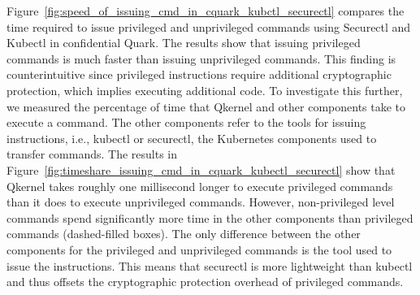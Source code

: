Figure~\ref{fig:speed_of_issuing_cmd_in_cquark_kubctl_securectl} compares the time required to issue privileged and unprivileged commands using Securectl and Kubectl in confidential Quark. The results show that issuing privileged commands is much faster than issuing unprivileged commands. 
This finding is counterintuitive since privileged instructions require additional cryptographic protection, which implies executing additional code. To investigate this further, we measured the percentage of time that Qkernel and other components take to execute a command. The other components 
refer to the tools for issuing instructions, i.e., kubectl or securectl, the Kubernetes components used to transfer commands. The results in Figure~\ref{fig:timeshare_issuing_cmd_in_cquark_kubectl_securectl} show that Qkernel takes roughly one millisecond longer to execute privileged commands than it does to execute unprivileged commands. However, non-privileged level commands spend significantly more 
time in the other components than privileged commands (dashed-filled boxes). The only difference between the other components for the privileged and unprivileged commands is the tool used to issue the instructions. This means that securectl is more lightweight than 
kubectl and thus offsets the cryptographic protection overhead of privileged commands.











